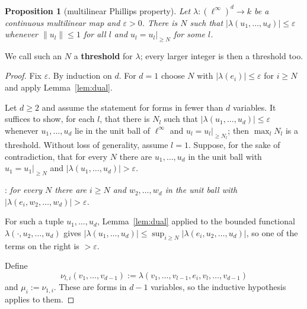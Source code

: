 \documentclass[11pt]{amsart}
\newtheorem{proposition}[theorem]{Proposition}
\theoremstyle{remark}
\newenvironment{stepclaim}[1]{\par\smallskip\noindent\underline{\smash{Step #1}}:\enspace\itshape\ignorespaces}{\par}
\newenvironment{stepproof}{\begin{list}{}{\setlength{\leftmargin}{1.5em}\setlength{\rightmargin}{0pt}%
  \setlength{\topsep}{2pt}\setlength{\partopsep}{0pt}\setlength{\parsep}{0pt}\setlength{\itemsep}{0pt}%
  \setlength{\listparindent}{\parindent}}\item\relax}{\end{list}\smallskip}
\newcommand{\kk}{k}
\newcommand{\linf}{\ell^\infty}
\newcommand{\abs}[1]{\lvert #1\rvert}
\newcommand{\norm}[1]{\lVert #1\rVert}
\newcommand{\1}{\mathbf{1}}
\newcommand{\tail}[2]{#2|_{\ge #1}}
\begin{document}
\begin{proposition}[multilinear Phillips property]\label{prop:tails}
Let $\lambda\colon(\linf)^d\to\kk$ be a continuous multilinear map and $\varepsilon>0$. There is $N$ such that
$\abs{\lambda(u_1,\dots,u_d)}\le\varepsilon$ whenever $\norm{u_l}\le1$ for all $l$ and $u_l=\tail N{u_l}$ for some $l$.
\end{proposition}
We call such an $N$ a \textbf{threshold} for $\lambda$; every larger integer is then a threshold too.
\begin{proof}
Fix $\varepsilon$. By induction on $d$. For $d=1$ choose $N$ with $\abs{\lambda(e_i)}\le\varepsilon$ for $i\ge N$ and apply Lemma~\ref{lem:dual}.

Let $d\ge2$ and assume the statement for forms in fewer than $d$ variables. It suffices to show, for each $l$, that there
is $N_l$ such that $\abs{\lambda(u_1,\dots,u_d)}\le\varepsilon$ whenever $u_1,\dots,u_d$ lie in the unit ball of $\linf$ and
$u_l=\tail{N_l}{u_l}$; then $\max_lN_l$ is a threshold. Without loss of generality, assume $l=1$.
Suppose, for the sake of contradiction, that for every $N$ there are $u_1,\dots,u_d$ in the unit ball with
$u_1=\tail N{u_1}$ and $\abs{\lambda(u_1,\dots,u_d)}>\varepsilon$.

\begin{stepclaim}{1}
for every $N$ there are $i\ge N$ and $w_2,\dots,w_d$ in the unit ball with $\abs{\lambda(e_i,w_2,\dots,w_d)}>\varepsilon$.
\end{stepclaim}
\begin{stepproof}
For such a tuple $u_1,\dots,u_d$, Lemma~\ref{lem:dual} applied to the bounded
functional $\lambda(\cdot,u_2,\dots,u_d)$ gives
$\abs{\lambda(u_1,\dots,u_d)}\le\sup_{i\ge N}\abs{\lambda(e_i,u_2,\dots,u_d)}$, so one of the terms on the right is $>\varepsilon$.
\end{stepproof}

Define
\[
\nu_{l,i}(v_1,\dots,v_{d-1}):=\lambda(v_1,\dots,v_{l-1},e_i,v_l,\dots,v_{d-1})
\]
and $\mu_i:=\nu_{1,i}$. These are forms in $d-1$ variables, so the inductive hypothesis applies to them.


\end{proof}
\end{document}
